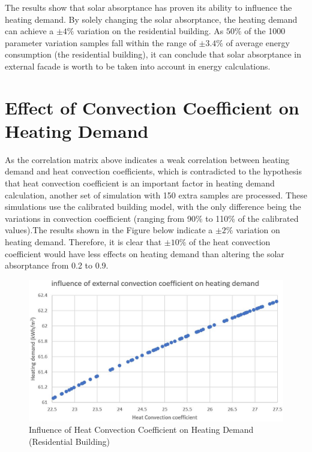 \documentclass[a4paper, oneside]{discothesis}
\begin{document}
        The results show that solar absorptance has proven its ability to influence the heating demand. By solely changing the solar absorptance, the heating demand can achieve a $\pm 4\%$ variation on the residential building. As $50\%$ of the 1000 parameter variation samples fall within the range of $\pm 3.4\%$ of average energy consumption (the residential building), it can conclude that solar absorptance in external facade is worth to be taken into account in energy calculations.

	\section{Effect of Convection Coefficient on Heating Demand}
        	As the correlation matrix above indicates a weak correlation between heating demand and heat convection coefficients, which is contradicted to the hypothesis that heat convection coefficient is an important factor in heating demand calculation, another set of simulation with 150 extra samples are processed. These simulations use the calibrated building model, with the only difference being the variations in convection coefficient (ranging from 90\% to 110\% of the calibrated values).The results shown in the Figure below indicate a $\pm 2\%$ variation on heating demand. Therefore, it is clear that $\pm 10\%$ of the heat convection coefficient would have less effects on heating demand than altering the solar absorptance from 0.2 to 0.9. \\ 
        	
          	\begin{figure}[htbp]
    		\centering
    		\includegraphics[scale=0.5]{Hongg_ConvCoe.JPG}
    		\caption{Influence of Heat Convection Coefficient on Heating Demand (Residential Building)}
    		\label{fig:Hongg_convcoef}
    		\end{figure}
        
\end{document}

